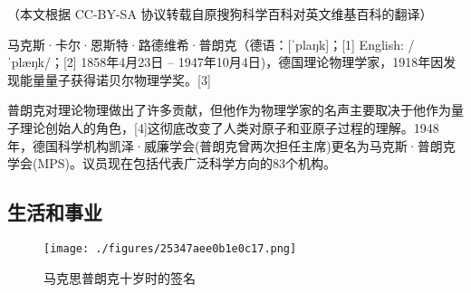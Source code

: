 
（本文根据 CC-BY-SA 协议转载自原搜狗科学百科对英文维基百科的翻译）

马克斯·卡尔·恩斯特·路德维希·普朗克（德语：[ˈplaŋk]；[1] English: /ˈplæŋk/；[2] 1858年4月23日 – 1947年10月4日)，德国理论物理学家，1918年因发现能量量子获得诺贝尔物理学奖。[3]

普朗克对理论物理做出了许多贡献，但他作为物理学家的名声主要取决于他作为量子理论创始人的角色，[4]这彻底改变了人类对原子和亚原子过程的理解。1948年，德国科学机构凯泽·威廉学会(普朗克曾两次担任主席)更名为马克斯·普朗克学会(MPS)。议员现在包括代表广泛科学方向的83个机构。

\subsection{生活和事业}
\begin{figure}[ht]
\centering
\texttt{[image: ./figures/25347aee0b1e0c17.png]}
\caption{马克思普朗克十岁时的签名} \label{fig_Max_1}
\end{figure}
